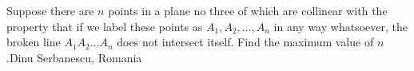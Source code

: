 Suppose there are $n$ points in a plane no three of which are collinear with the property that if we label these points as $A_1,A_2,\ldots,A_n$ in any way whatsoever, the broken line $A_1A_2\ldots A_n$ does not intersect itself. Find the maximum value of $n$.Dinu Serbanescu, Romania